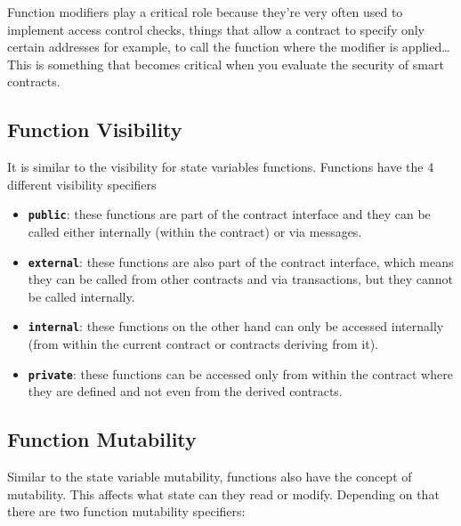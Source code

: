 Function modifiers play a critical role because they're very often used
to implement access control checks, things that allow a contract to
specify only certain addresses for example, to call the function where
the modifier is applied\ldots{} This is something that becomes critical
when you evaluate the security of smart contracts.

\subsection{Function Visibility}\label{function-visibility}

It is similar to the visibility for state variables functions. Functions
have the 4 different visibility specifiers

\begin{itemize}
\tightlist
\item
  \textbf{\texttt{public}}: these functions are part of the contract
  interface and they can be called either internally (within the
  contract) or via messages.
\item
  \textbf{\texttt{external}}: these functions are also part of the
  contract interface, which means they can be called from other
  contracts and via transactions, but they cannot be called internally.
\item
  \textbf{\texttt{internal}}: these functions on the other hand can only
  be accessed internally (from within the current contract or contracts
  deriving from it).
\item
  \textbf{\texttt{private}}: these functions can be accessed only from
  within the contract where they are defined and not even from the
  derived contracts.
\end{itemize}

\subsection{Function Mutability}\label{function-mutability}

Similar to the state variable mutability, functions also have the
concept of mutability. This affects what state can they read or modify.
Depending on that there are two function mutability specifiers:

